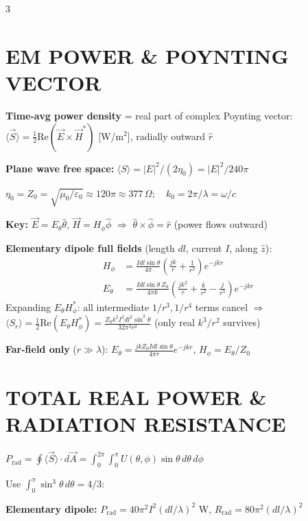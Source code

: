 \documentclass[6pt,landscape]{article}
\begin{document}
\fontsize{6}{7}\selectfont
\begin{multicols}{3}

\section*{EM POWER \& POYNTING VECTOR}
\textbf{Time-avg power density} = real part of complex Poynting vector:
$\langle\vec{S}\rangle=\tfrac{1}{2}\text{Re}(\vec{E}\times\vec{H}^*)$ [W/m$^2$], radially outward $\hat{r}$

\textbf{Plane wave free space:} $\langle S\rangle=|E|^2/(2\eta_0)=|E|^2/240\pi$

$\eta_0=Z_0=\sqrt{\mu_0/\varepsilon_0}\approx120\pi\approx377\,\Omega;\quad k_0=2\pi/\lambda=\omega/c$

\textbf{Key:} $\vec{E}=E_\theta\hat{\theta}$, $\vec{H}=H_\phi\hat{\phi}$ $\Rightarrow$ $\hat{\theta}\times\hat{\phi}=\hat{r}$ (power flows outward)

\textbf{Elementary dipole full fields} (length $dl$, current $I$, along $\hat{z}$):
\vspace{-2pt}
\begin{align*}
H_\phi&=\frac{Idl\sin\theta}{4\pi}\!\left(\frac{jk}{r}+\frac{1}{r^2}\right)\!e^{-jkr}\\[-2pt]
E_\theta&=\frac{Idl\sin\theta\,Z_0}{4\pi k}\!\left(\frac{jk^2}{r}+\frac{k}{r^2}-\frac{j}{r^3}\right)\!e^{-jkr}
\end{align*}
\vspace{-4pt}
Expanding $E_\theta H_\phi^*$: all intermediate $1/r^3,1/r^4$ terms cancel $\Rightarrow$\\
$\langle S_r\rangle=\tfrac{1}{2}\text{Re}(E_\theta H_\phi^*)=\frac{Z_0 k^2 I^2 dl^2\sin^2\theta}{32\pi^2 r^2}$ (only real $k^3/r^2$ survives)

\textbf{Far-field only} ($r\gg\lambda$): $E_\theta=\frac{jkZ_0 Idl\sin\theta}{4\pi r}e^{-jkr}$, $H_\phi=E_\theta/Z_0$

\section*{TOTAL REAL POWER \& RADIATION RESISTANCE}
$P_\text{rad}=\oint\langle\vec{S}\rangle\cdot d\vec{A}=\int_0^{2\pi}\!\int_0^\pi U(\theta,\phi)\sin\theta\,d\theta\,d\phi$

Use $\int_0^\pi\sin^3\theta\,d\theta=4/3$:

\textbf{Elementary dipole:} $P_\text{rad}=40\pi^2 I^2(dl/\lambda)^2$ W, $R_\text{rad}=80\pi^2(dl/\lambda)^2$


\end{multicols}
\end{document}
